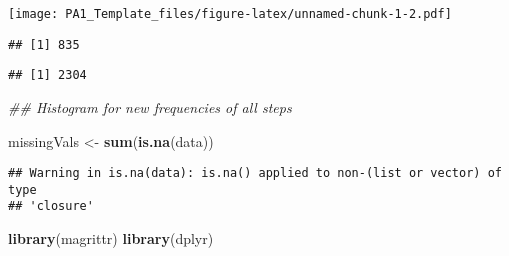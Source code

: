 \documentclass[
]{article}
\newenvironment{Shaded}{\begin{snugshade}}{\end{snugshade}}
\newcommand{\CommentTok}[1]{\textcolor[rgb]{0.56,0.35,0.01}{\textit{#1}}}
\newcommand{\DecValTok}[1]{\textcolor[rgb]{0.00,0.00,0.81}{#1}}
\newcommand{\KeywordTok}[1]{\textcolor[rgb]{0.13,0.29,0.53}{\textbf{#1}}}
\newcommand{\NormalTok}[1]{#1}
\newcommand{\OperatorTok}[1]{\textcolor[rgb]{0.81,0.36,0.00}{\textbf{#1}}}
\newcommand{\StringTok}[1]{\textcolor[rgb]{0.31,0.60,0.02}{#1}}
\begin{document}
\texttt{[image: PA1\_Template\_files/figure-latex/unnamed-chunk-1-2.pdf]}

\begin{Shaded}
\end{Shaded}

\begin{verbatim}
## [1] 835
\end{verbatim}

\begin{Shaded}
\end{Shaded}

\begin{verbatim}
## [1] 2304
\end{verbatim}

\begin{Shaded}
\begin{Highlighting}[]
\CommentTok{## Histogram for new frequencies of all steps}

\NormalTok{missingVals <-}\StringTok{ }\KeywordTok{sum}\NormalTok{(}\KeywordTok{is.na}\NormalTok{(data))}
\end{Highlighting}
\end{Shaded}

\begin{verbatim}
## Warning in is.na(data): is.na() applied to non-(list or vector) of type
## 'closure'
\end{verbatim}

\begin{Shaded}
\begin{Highlighting}[]
\KeywordTok{library}\NormalTok{(magrittr)}
\KeywordTok{library}\NormalTok{(dplyr)}
\end{Highlighting}
\end{Shaded}
\end{document}
